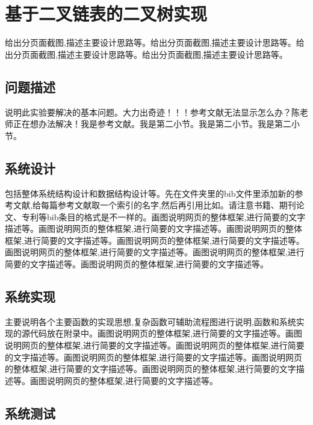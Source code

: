 \documentclass[supercite]{Experimental_Report}
\theoremstyle{definition}
\begin{document}
\newpage

\section{基于二叉链表的二叉树实现}

给出分页面截图,描述主要设计思路等。给出分页面截图,描述主要设计思路等。给出分页面截图,描述主要设计思路等。给出分页面截图,描述主要设计思路等。

\subsection{问题描述}

说明此实验要解决的基本问题。大力出奇迹！！！参考文献无法显示怎么办？陈老师正在想办法解决\cite{STR2021Neurocom, AVS2021Neurocom}！我是参考文献。我是第二小节\cite{Mehrabian1974An}。我是第二小节\cite{Rezaei2014CVPR}。我是第二小节\cite{Ramnath2008IJCV}。

\subsection{系统设计}

包括整体系统结构设计和数据结构设计等。先在文件夹里的bib文件里添加新的参考文献,给每篇参考文献取一个索引的名字,然后再引用比如\cite{STR2021Neurocom}\cite{AVS2021Neurocom, Rezaei2014CVPR}。请注意书籍、期刊论文、专利等bib条目的格式是不一样的。画图说明网页的整体框架,进行简要的文字描述等。画图说明网页的整体框架,进行简要的文字描述等。画图说明网页的整体框架,进行简要的文字描述等。画图说明网页的整体框架,进行简要的文字描述等。画图说明网页的整体框架,进行简要的文字描述等。画图说明网页的整体框架,进行简要的文字描述等。画图说明网页的整体框架,进行简要的文字描述等。

\subsection{系统实现}

主要说明各个主要函数的实现思想,复杂函数可辅助流程图进行说明,函数和系统实现的源代码放在附录中。画图说明网页的整体框架,进行简要的文字描述等。画图说明网页的整体框架,进行简要的文字描述等。画图说明网页的整体框架,进行简要的文字描述等。画图说明网页的整体框架,进行简要的文字描述等。画图说明网页的整体框架,进行简要的文字描述等。画图说明网页的整体框架,进行简要的文字描述等。画图说明网页的整体框架,进行简要的文字描述等。

\subsection{系统测试}
\end{document}
